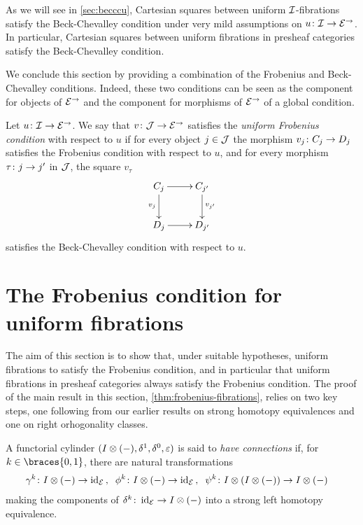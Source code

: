 \documentclass[reqno,10pt,a4paper,oneside,draft]{amsart}
\begin{document}
As we will see in \cref{sec:becccu}, Cartesian squares between uniform $\cal{I}$-fibrations satisfy the Beck-Chevalley condition under very mild assumptions on $u \co \cal{I} \to \cal{E}^\to$.
In particular, Cartesian squares between uniform fibrations in presheaf categories satisfy the Beck-Chevalley condition.

\medskip

We conclude this section by providing a combination of the Frobenius and Beck-Chevalley conditions.
Indeed, these two conditions can be seen as the component for objects of $\cal{E}^\to$ and the component for morphisms of $\cal{E}^\to$ of a global condition.


\begin{definition}
Let $u \co \cal{I} \to \catE^\to$.
We say that $v \co \cal{J} \to \catE^\to$ satisfies the \emph{uniform Frobenius condition} with respect to $u$ if for every object $j \in \cal{J}$ the morphism $v_j \co C_j \to D_j$ satisfies the Frobenius condition with respect to $u$, and for every morphism $\tau \co j \to j'$ in $\cal{J}$, the square $v_\tau$
\[
\xymatrix{
C_j \ar[r] \ar[d]_{v_j} & C_{j'} \ar[d]^{v_{j'}} \\
D_j \ar[r] & D_{j'}}
\]
satisfies the Beck-Chevalley condition with respect to $u$.
\end{definition}




\section{The Frobenius condition for uniform fibrations}
\label{sec:frocuf}

The aim of this section is to show that, under suitable hypotheses, uniform fibrations to satisfy the Frobenius condition, and in particular that uniform fibrations in presheaf categories always satisfy the Frobenius condition.
The proof of the main result in this section, \cref{thm:frobenius-fibrations}, relies on two key steps, one following from our earlier results on strong homotopy equivalences and one on right orhogonality classes.



\begin{definition}
A functorial cylinder $(\interval \otimes (-), \rcyl, \lcyl, \ccyl)$ is said to \emph{have connections} if, for $k \in \braces{0, 1}$, there are natural transformations
\begin{align*}
  \gamma^k &\co \interval \otimes (-) \to \id_\catE \rlap{,} &
  \phi^k &\co \interval \otimes (-) \to \id_\catE \rlap{,} &
  \psi^k &\co \interval \otimes (\interval \otimes (-)) \to \interval \otimes (-)
\end{align*}
making the components of $\kcyl \co \id_\cal{E} \to \interval \otimes (-)$ into a strong left homotopy equivalence.
\end{definition}
\end{document}
